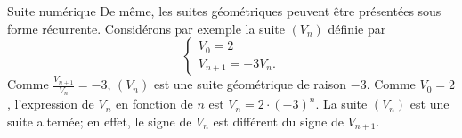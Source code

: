 \begin{chapter}{Suite num\'erique}
De m\^eme, les suites g\'eom\'etriques peuvent \^etre pr\'esent\'ees sous forme r\'ecurrente.
Consid\'erons par exemple la suite $(V_n)$ d\'efinie par 
\[
\left\lbrace
\begin{array}{l}
V_0 = 2 \\
V_{n+1} = -3  V_n .
\end{array}
\right.
\]
Comme $\frac{V_{n+1}}{V_n} = -3$, $(V_n)$ est une suite g\'eom\'etrique de raison $-3$.
Comme $V_0 = 2$, l'expression de $V_n$ en fonction de $n$ est $V_n = 2 \cdot (-3)^n$.
La suite $(V_n)$ est une suite altern\'ee; en effet, le signe de $V_n$ est diff\'erent du signe de $V_{n+1}$.
%
%
























\end{chapter}

